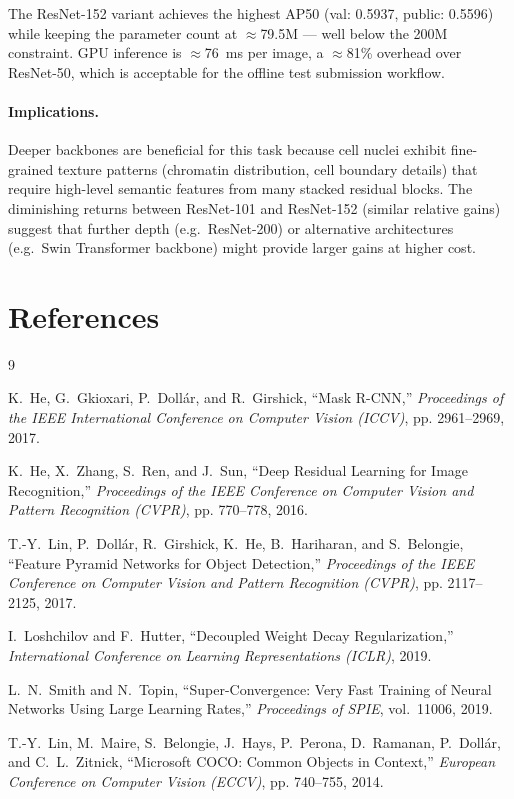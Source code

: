 \documentclass[11pt]{article}
\begin{document}
The ResNet-152 variant achieves the highest AP50 (val: 0.5937,
public: 0.5596) while keeping the parameter count at $\approx$79.5M
— well below the 200M constraint.
GPU inference is $\approx$76~ms per image, a $\approx$81\% overhead over
ResNet-50, which is acceptable for the offline test submission workflow.

\paragraph{Implications.}
Deeper backbones are beneficial for this task because cell nuclei exhibit
fine-grained texture patterns (chromatin distribution, cell boundary
details) that require high-level semantic features from many stacked
residual blocks. The diminishing returns between ResNet-101 and ResNet-152
(similar relative gains) suggest that further depth (e.g.\ ResNet-200) or
alternative architectures (e.g.\ Swin Transformer backbone) might provide
larger gains at higher cost.

\section{References}

\begin{thebibliography}{9}

K.~He, G.~Gkioxari, P.~Doll\'{a}r, and R.~Girshick,
``Mask R-CNN,''
\emph{Proceedings of the IEEE International Conference on Computer Vision (ICCV)},
pp. 2961--2969, 2017.

K.~He, X.~Zhang, S.~Ren, and J.~Sun,
``Deep Residual Learning for Image Recognition,''
\emph{Proceedings of the IEEE Conference on Computer Vision and Pattern Recognition (CVPR)},
pp. 770--778, 2016.

T.-Y.~Lin, P.~Doll\'{a}r, R.~Girshick, K.~He, B.~Hariharan, and S.~Belongie,
``Feature Pyramid Networks for Object Detection,''
\emph{Proceedings of the IEEE Conference on Computer Vision and Pattern Recognition (CVPR)},
pp. 2117--2125, 2017.

I.~Loshchilov and F.~Hutter,
``Decoupled Weight Decay Regularization,''
\emph{International Conference on Learning Representations (ICLR)},
2019.

L.~N.~Smith and N.~Topin,
``Super-Convergence: Very Fast Training of Neural Networks Using Large Learning Rates,''
\emph{Proceedings of SPIE}, vol.~11006, 2019.

T.-Y.~Lin, M.~Maire, S.~Belongie, J.~Hays, P.~Perona, D.~Ramanan,
P.~Doll\'{a}r, and C.~L.~Zitnick,
``Microsoft COCO: Common Objects in Context,''
\emph{European Conference on Computer Vision (ECCV)},
pp. 740--755, 2014.

\end{thebibliography}
\end{document}
